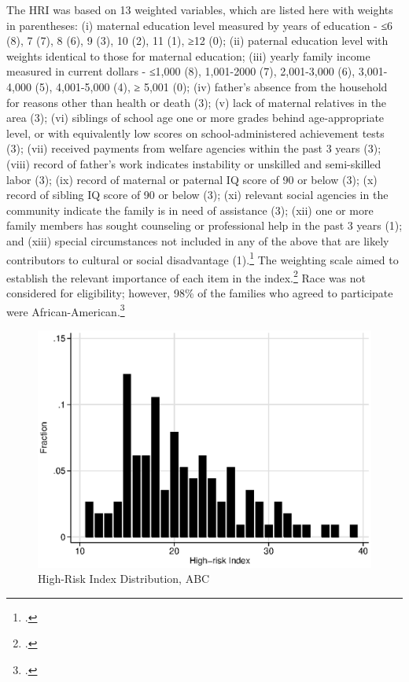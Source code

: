 \begin{appendices}
\noindent The HRI was based on 13 weighted variables, which are listed here with weights in parentheses: (i) maternal education level measured by years of education - ≤6 (8), 7 (7), 8 (6), 9 (3), 10 (2), 11 (1), ≥12 (0); (ii) paternal education level with weights identical to those for maternal education; (iii) yearly family income measured in current dollars - ≤1,000 (8), 1,001-2000 (7), 2,001-3,000 (6), 3,001-4,000 (5), 4,001-5,000 (4), ≥ 5,001 (0); (iv) father's absence from the household for reasons other than health or death (3); (v) lack of maternal relatives in the area (3); (vi) siblings of school age one or more grades behind age-appropriate level, or with equivalently low scores on school-administered achievement tests (3); (vii) received payments from welfare agencies within the past 3 years (3); (viii) record of father's work indicates instability or unskilled and semi-skilled labor (3); (ix) record of maternal or paternal IQ score of 90 or below (3); (x) record of sibling IQ score of 90 or below (3); (xi) relevant social agencies in the community indicate the family is in need of assistance (3); (xii) one or more family members has sought counseling or professional help in the past 3 years (1); and (xiii) special circumstances not included in any of the above that are likely contributors to cultural or social disadvantage (1).\footnote{\citet{Ramey_Smith_1977_AJMD, Ramey_Campbell_1984_AJMD,Ramey_Campbell_1991_childreninpoverty,Ramey_Campbell_etal_2000_ADS}.} The weighting scale aimed to establish the relevant importance of each item in the index.\footnote{\citet{Ramey_Smith_1977_AJMD}.} Race was not  considered for eligibility; however, 98\% of the families who agreed to participate were African-American.\footnote{\citet{Ramey_Smith_1977_AJMD,Ramey_Campbell_1979_SR}.} \\

\begin{center}
	\begin{figure}[H]
		\caption{High-Risk Index Distribution, ABC} \label{figure:hridistabc}
		\centering
		\includegraphics[width=.9\columnwidth]{output/abc_hri.eps}
	\end{figure}
\end{center}


\end{appendices}

